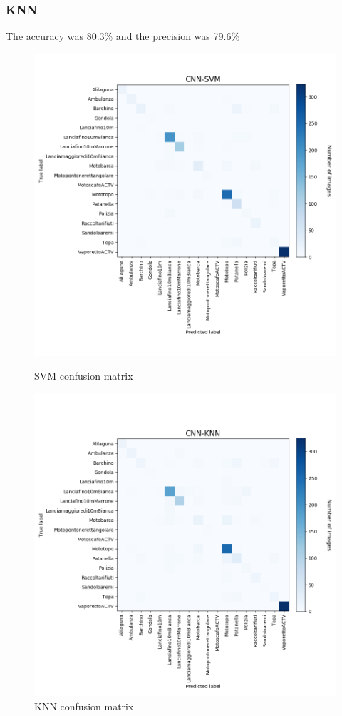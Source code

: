 \documentclass[12pt]{article}
\begin{document}
\subsubsection{KNN}
The accuracy was 80.3\% and the precision was 79.6\%

\begin{figure}[!ht]
	\centering
	\begin{minipage}{.5\textwidth}
		\centering
		\includegraphics[width=.8\linewidth]{../code/output/CNN-SVM.png}
		\caption{SVM confusion matrix} %
		\label{fig:cnf_svm}
	\end{minipage}%
	\begin{minipage}{.5\textwidth}
		\centering
		\includegraphics[width=.8\linewidth]{../code/output/CNN-KNN.png}
		\caption{KNN confusion matrix} %
		\label{fig:cnf_knn}
	\end{minipage}
\end{figure}
\end{document}
